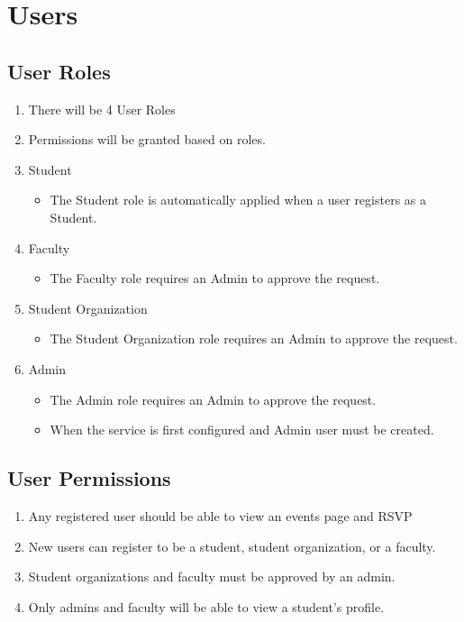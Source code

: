 \documentclass{article}
\begin{document}
\section{Users}
	\subsection{User Roles}
		\begin{enumerate}[leftmargin=3\parindent]
			\item There will be 4 User Roles
			\item Permissions will be granted based on roles.
			\item Student
				\begin{itemize}
					\item The Student role is automatically applied when a user registers as a Student.
				\end{itemize}
			\item Faculty
				\begin{itemize}
					\item The Faculty role requires an Admin to approve the request.
				\end{itemize}
			\item Student Organization
				\begin{itemize}
					\item The Student Organization role requires an Admin to approve the request.
				\end{itemize}
			\item Admin
				\begin{itemize}
					\item The Admin role requires an Admin to approve the request.
					\item When the service is first configured and Admin user must be created.
				\end{itemize}
		\end{enumerate}
	\subsection{User Permissions}
		\begin{enumerate}[leftmargin=3\parindent]
			\item Any registered user should be able to view an events page and RSVP
			\item New users can register to be a student, student organization, or a faculty.
			\item Student organizations and faculty must be approved by an admin.
			\item Only admins and faculty will be able to view a student’s profile.
		\end{enumerate}
\end{document}
